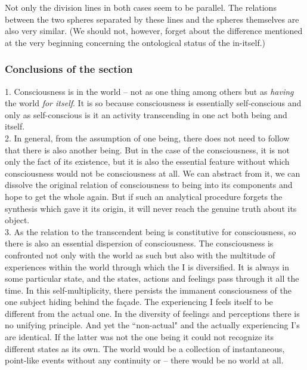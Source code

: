 Not only the division lines in both cases seem to be parallel. The relations between the two spheres separated by 
these lines and the spheres themselves are also very similar. (We should not, however, forget about the difference 
mentioned at the very beginning concerning the ontological status of the in-itself.)


\subsubsection{ Conclusions of the section}\label{empConc}
1. Consciousness is in the world -- not as one thing among others but as 
{\em having} the world {\em for itself}. It is so 
because consciousness is essentially self-conscious and only as self-conscious is it an activity transcending in one 
act both being and itself. \\[1ex]
2. In general, from the assumption of one being, there does not need to follow that there is also another being. 
But in the case of the consciousness, it is not only the fact of its existence, but it is also the essential feature 
without which consciousness would not be consciousness at all. We can abstract from it, we can dissolve the 
original relation of consciousness to being into its components and hope to get the whole again. But if such an 
analytical procedure forgets the synthesis which gave it its origin, it will never reach the genuine truth about its object. \\[1ex]
3. As the relation to the transcendent being is constitutive for consciousness, so there is also an essential 
dispersion of consciousness. The consciousness is confronted not only with the world as such but also with the 
multitude of experiences within the world through which the I is diversified. It is always in some particular state, 
and the states, actions and feelings pass through it all the time. In this self-multiplicity, there persists the 
immanent consciousness of the one subject hiding behind the fa\c{c}ade. The experiencing I feels itself to be different 
from the actual one. In the diversity of feelings and perceptions there is no unifying principle. And yet the ``non-actual" and the actually experiencing I's are identical. If the latter was not the one being it could not recognize its 
different states as its own. The world would be a collection of instantaneous, point-like events without any 
continuity or -- there would be no world at all.

